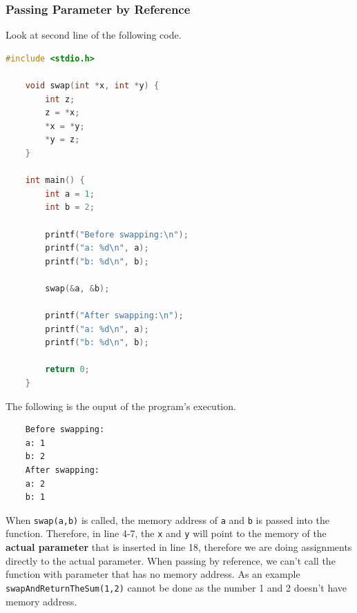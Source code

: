 \subsubsection{Passing Parameter by Reference}
Look at second line of the following code.
\begin{lstlisting}[language=c,caption = Passing by Reference,label=lst:passbyreference01]
    #include <stdio.h>

    void swap(int *x, int *y) {
        int z;
        z = *x;
        *x = *y;
        *y = z;
    }
    
    int main() {
        int a = 1;
        int b = 2;
        
        printf("Before swapping:\n");
        printf("a: %d\n", a);
        printf("b: %d\n", b);
        
        swap(&a, &b);
        
        printf("After swapping:\n");
        printf("a: %d\n", a);
        printf("b: %d\n", b);
        
        return 0;
    }
\end{lstlisting}
The following is the ouput of the program's execution.
\begin{verbatim}
    Before swapping:
    a: 1
    b: 2
    After swapping:
    a: 2
    b: 1
\end{verbatim}

When \verb|swap(a,b)| is called,
the memory address of \verb|a| and \verb|b| is passed into
the function. Therefore, in line 4-7, the \verb|x| and
\verb|y| will point to the memory of the \textbf{actual parameter}
that is inserted in line 18, therefore we are doing assignments
directly to the actual parameter. When passing by reference,
we can't call the function with parameter that has no memory
address. As an example \verb|swapAndReturnTheSum(1,2)| cannot be
done as the number 1 and 2 doesn't have memory address.

